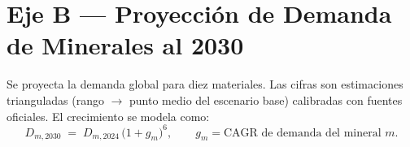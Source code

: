 \documentclass[11pt,letterpaper]{report}
\begin{document}
\chapter{Eje B --- Proyección de Demanda de Minerales al 2030}
\label{cap:minerales}
Se proyecta la demanda global para diez materiales. Las cifras son estimaciones trianguladas (rango $\rightarrow$ punto medio del
escenario base) calibradas con fuentes oficiales. El crecimiento se modela como:
\begin{equation}
D_{m,2030} \;=\; D_{m,2024}\,\bigl(1+g_m\bigr)^{6}, \qquad g_m=\text{CAGR de demanda del mineral } m.
\label{eq:demanda}
\end{equation}
\end{document}
